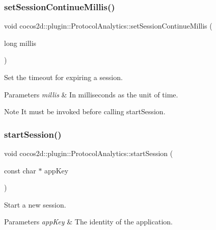 \subsubsection{\texorpdfstring{set\+Session\+Continue\+Millis()}{setSessionContinueMillis()}}
{\footnotesize\ttfamily void cocos2d\+::plugin\+::\+Protocol\+Analytics\+::set\+Session\+Continue\+Millis (\begin{DoxyParamCaption}\item[{long}]{millis }\end{DoxyParamCaption})}



Set the timeout for expiring a session. 


\begin{DoxyParams}{Parameters}
{\em millis} & In milliseconds as the unit of time. \\
\hline
\end{DoxyParams}
\begin{DoxyNote}{Note}
It must be invoked before calling start\+Session. 
\end{DoxyNote}
\mbox{\label{classcocos2d_1_1plugin_1_1ProtocolAnalytics_a06e31e415d1354d3abf4775c389a67ae}} 
\subsubsection{\texorpdfstring{start\+Session()}{startSession()}}
{\footnotesize\ttfamily void cocos2d\+::plugin\+::\+Protocol\+Analytics\+::start\+Session (\begin{DoxyParamCaption}\item[{const char $\ast$}]{app\+Key }\end{DoxyParamCaption})}



Start a new session. 


\begin{DoxyParams}{Parameters}
{\em app\+Key} & The identity of the application. \\
\hline
\end{DoxyParams}
\mbox{\label{classcocos2d_1_1plugin_1_1ProtocolAnalytics_a75e7cfb9f04fa49b795fd195fe663204}} 
